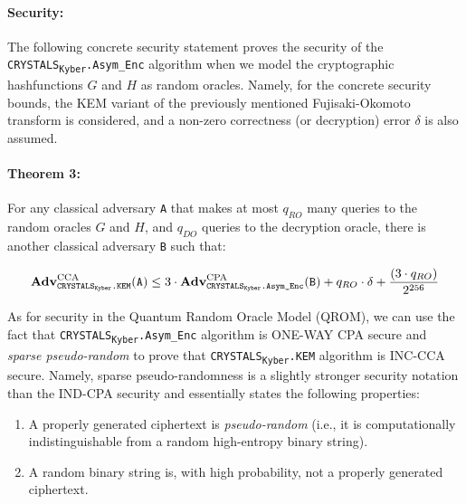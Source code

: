 \documentclass[runningheads]{llncs}
\numberwithin{equation}{section}
\begin{document}
    \paragraph{\textbf{Security:}} The following concrete security statement proves the security of the \texorpdfstring{\texttt{CRYSTALS}\textsubscript{\texttt{Kyber}}\texttt{.Asym\_Enc}}\/ algorithm when we model the cryptographic hash\break functions $G$ and $H$ as random oracles. Namely, for the concrete security bounds, the KEM variant of the previously mentioned Fujisaki-Okomoto transform is considered, and a non-zero correctness (or decryption) error $\delta$ is also assumed.

    \paragraph{\textbf{Theorem 3:}} For any classical adversary \texttt{A} that makes at most ${q}_{RO}$ many queries to the random oracles $G$ and $H$, and ${q}_{DO}$ queries to the decryption oracle, there is another classical adversary \texttt{B} such that:

    \vspace{-3.4ex}
    $$ {\text{\textbf{Adv}}}_{{\text{\texttt{CRYSTALS}\textsubscript{\texttt{Kyber}}\texttt{.KEM}}}}^{\text{CCA}}\text{(\texttt{A})} \leq 3 \cdot {\text{\textbf{Adv}}}_{{\text{\texttt{CRYSTALS}\textsubscript{\texttt{Kyber}}\texttt{.Asym\_Enc}}}}^{\text{CPA}}\text{(\texttt{B})} + {q}_{RO} \cdot \delta + \frac{ ( 3 \cdot {q}_{RO} ) }{ {2}^{256} } $$

    \noindent As for security in the Quantum Random Oracle Model (QROM), we can use the fact that \texorpdfstring{\texttt{CRYSTALS}\textsubscript{\texttt{Kyber}}\texttt{.Asym\_Enc}}\/ algorithm is ONE-WAY CPA secure and \textit{sparse pseudo-random} to prove that \texorpdfstring{\texttt{CRYSTALS}\textsubscript{\texttt{Kyber}}\texttt{.KEM}}\/ algorithm is INC-CCA secure. Namely, sparse pseudo-randomness is a slightly stronger security notation than the IND-CPA security and essentially states the following properties:

    \begin{enumerate}
        \item A properly generated ciphertext is \textit{pseudo-random} (i.e., it is computationally indistinguishable from a random high-entropy binary string).
        \item A random binary string is, with high probability, not a properly generated ciphertext.
    \end{enumerate}
\end{document}
